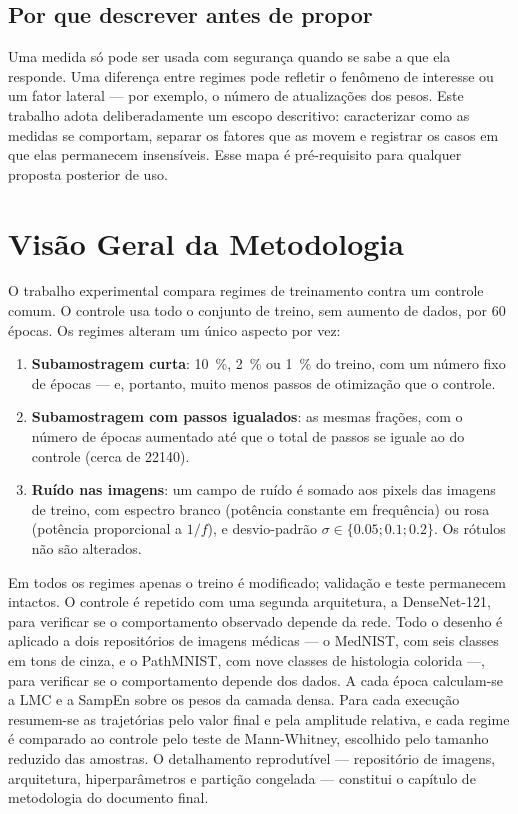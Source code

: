 \subsection{Por que descrever antes de propor}

Uma medida só pode ser usada com segurança quando se sabe a que ela responde.
Uma diferença entre regimes pode refletir o fenômeno de interesse ou um fator
lateral --- por exemplo, o número de atualizações dos pesos. Este trabalho
adota deliberadamente um escopo descritivo: caracterizar como as medidas se
comportam, separar os fatores que as movem e registrar os casos em que elas
permanecem insensíveis. Esse mapa é pré-requisito para qualquer proposta
posterior de uso.

\section{Visão Geral da Metodologia}
\label{sec:P-metodologia}

O trabalho experimental compara regimes de treinamento contra um controle comum.
O controle usa todo o conjunto de treino, sem aumento de dados, por \num{60}
épocas. Os regimes alteram um único aspecto por vez:

\begin{enumerate}
    \item \textbf{Subamostragem curta}: \SI{10}{\percent}, \SI{2}{\percent} ou
          \SI{1}{\percent} do treino, com um número fixo de épocas --- e,
          portanto, muito menos passos de otimização que o controle.
    \item \textbf{Subamostragem com passos igualados}: as mesmas frações, com o
          número de épocas aumentado até que o total de passos se iguale ao do
          controle (cerca de \num{22140}).
    \item \textbf{Ruído nas imagens}: um campo de ruído é somado aos pixels das
          imagens de treino, com espectro branco (potência constante em
          frequência) ou rosa (potência proporcional a $1/f$), e desvio-padrão
          $\sigma \in \{\num{0,05}; \num{0,1}; \num{0,2}\}$. Os rótulos não são
          alterados.
\end{enumerate}

Em todos os regimes apenas o treino é modificado; validação e teste permanecem
intactos. O controle é repetido com uma segunda arquitetura, a DenseNet-121,
para verificar se o comportamento observado depende da rede. Todo o desenho
é aplicado a dois repositórios de imagens médicas --- o MedNIST, com seis
classes em tons de cinza, e o PathMNIST, com nove classes de histologia
colorida ---, para verificar se o comportamento depende dos dados. A cada época calculam-se a LMC e a SampEn sobre os pesos da camada
densa. Para cada execução resumem-se as trajetórias pelo valor final e pela
amplitude relativa, e cada regime é comparado ao controle pelo teste de
Mann-Whitney, escolhido pelo tamanho reduzido das amostras. O detalhamento
reprodutível --- repositório de imagens, arquitetura, hiperparâmetros e
partição congelada --- constitui o capítulo de metodologia do documento final.

